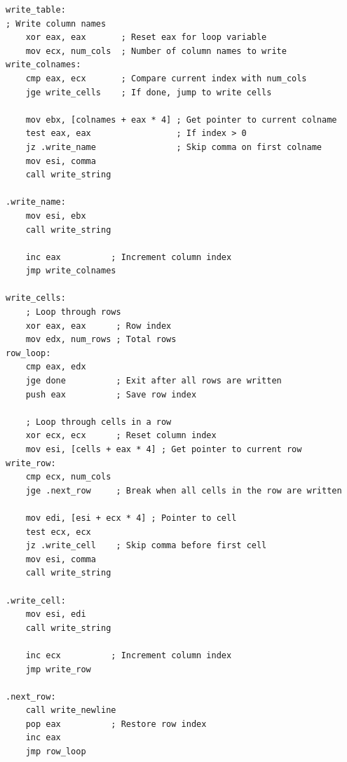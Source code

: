 \begin{lstlisting}
write_table:
; Write column names
    xor eax, eax       ; Reset eax for loop variable
    mov ecx, num_cols  ; Number of column names to write
write_colnames:
    cmp eax, ecx       ; Compare current index with num_cols
    jge write_cells    ; If done, jump to write cells

    mov ebx, [colnames + eax * 4] ; Get pointer to current colname
    test eax, eax                 ; If index > 0
    jz .write_name                ; Skip comma on first colname
    mov esi, comma
    call write_string

.write_name:
    mov esi, ebx
    call write_string

    inc eax          ; Increment column index
    jmp write_colnames

write_cells:
    ; Loop through rows
    xor eax, eax      ; Row index
    mov edx, num_rows ; Total rows
row_loop:
    cmp eax, edx
    jge done          ; Exit after all rows are written
    push eax          ; Save row index

    ; Loop through cells in a row
    xor ecx, ecx      ; Reset column index
    mov esi, [cells + eax * 4] ; Get pointer to current row
write_row:
    cmp ecx, num_cols
    jge .next_row     ; Break when all cells in the row are written

    mov edi, [esi + ecx * 4] ; Pointer to cell
    test ecx, ecx
    jz .write_cell    ; Skip comma before first cell
    mov esi, comma
    call write_string

.write_cell:
    mov esi, edi
    call write_string

    inc ecx          ; Increment column index
    jmp write_row

.next_row:
    call write_newline
    pop eax          ; Restore row index
    inc eax
    jmp row_loop
\end{lstlisting}

